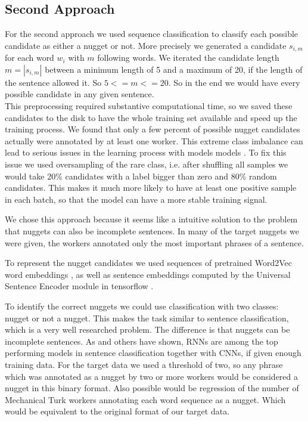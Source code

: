 \documentclass{article}
\begin{document}
 \subsection{Second Approach}
For the second approach we used sequence classification to classify each possible candidate as either a nugget or not. More precisely we generated a candidate $s_{i,m}$ for each word $w_i$ with $m$ following words. We iterated the candidate length $m=|s_{i,m}|$ between a minimum length of 5 and a maximum of 20, if the length of the sentence allowed it. So $5<=m<=20$. So in the end we would have every possible candidate in any given sentence. \\
This preprocessing required substantive computational time, so we saved these candidates to the disk to have the whole training set available and speed up the training process. We found that only a few percent of possible nugget candidates actually were annotated by at least one worker. This extreme class imbalance can lead to serious issues in the learning process with models models \citep{japkowicz2002class}. To fix this issue we used oversampling of the rare class, i.e. after shuffling all samples we would take 20\% candidates with a label bigger than zero and 80\% random candidates. This makes it much more likely to have at least one positive sample in each batch, so that the model can have a more stable training signal.

We chose this approach because it seems like a intuitive solution to the problem that nuggets can also be incomplete sentences. In many of the target nuggets we were given, the workers annotated only the most important phrases of a sentence.

To represent the nugget candidates we used sequences of pretrained Word2Vec word embeddings \cite{w2v}, as well as sentence embeddings computed by the Universal Sentence Encoder module in tensorflow \cite{universal2018}.

To identify the correct nuggets we could use classification with two classes: nugget or not a nugget. This makes the task similar to sentence classification, which is a very well researched problem. The difference is that nuggets can be incomplete sentences. As \citep{zhou2015c} and others have shown, RNNs are among the top performing models in sentence classification together with CNNs, if given enough training data. For the target data we used a threshold of two, so any phrase which was annotated as a nugget by two or more workers would be considered a nugget in this binary format. Also possible would be regression of the number of Mechanical Turk workers annotating each word sequence as a nugget. Which would be equivalent to the original format of our target data.\\
\end{document}
